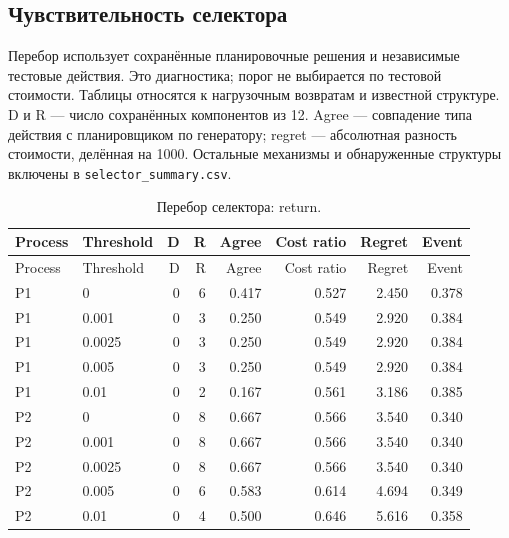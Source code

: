 \subsection{Чувствительность селектора}

Перебор использует сохранённые планировочные решения и независимые тестовые действия. Это диагностика; порог не выбирается по тестовой стоимости. Таблицы относятся к нагрузочным возвратам и известной структуре. D и R — число сохранённых компонентов из 12. Agree — совпадение типа действия с планировщиком по генератору; regret — абсолютная разность стоимости, делённая на 1000. Остальные механизмы и обнаруженные структуры включены в \texttt{selector\_summary.csv}.

\begingroup\small\setlength{\tabcolsep}{3pt}\begin{longtable}{llrrrrrr}\caption{Перебор селектора: return.}\\\toprule

Process & Threshold & D & R & Agree & Cost ratio & Regret & Event\\\midrule\endfirsthead

\toprule Process & Threshold & D & R & Agree & Cost ratio & Regret & Event\\\midrule\endhead

P1 & 0 & 0 & 6 & 0.417 & 0.527 & 2.450 & 0.378\\

P1 & 0.001 & 0 & 3 & 0.250 & 0.549 & 2.920 & 0.384\\

P1 & 0.0025 & 0 & 3 & 0.250 & 0.549 & 2.920 & 0.384\\

P1 & 0.005 & 0 & 3 & 0.250 & 0.549 & 2.920 & 0.384\\

P1 & 0.01 & 0 & 2 & 0.167 & 0.561 & 3.186 & 0.385\\

P2 & 0 & 0 & 8 & 0.667 & 0.566 & 3.540 & 0.340\\

P2 & 0.001 & 0 & 8 & 0.667 & 0.566 & 3.540 & 0.340\\

P2 & 0.0025 & 0 & 8 & 0.667 & 0.566 & 3.540 & 0.340\\

P2 & 0.005 & 0 & 6 & 0.583 & 0.614 & 4.694 & 0.349\\

P2 & 0.01 & 0 & 4 & 0.500 & 0.646 & 5.616 & 0.358\\


\end{longtable}
